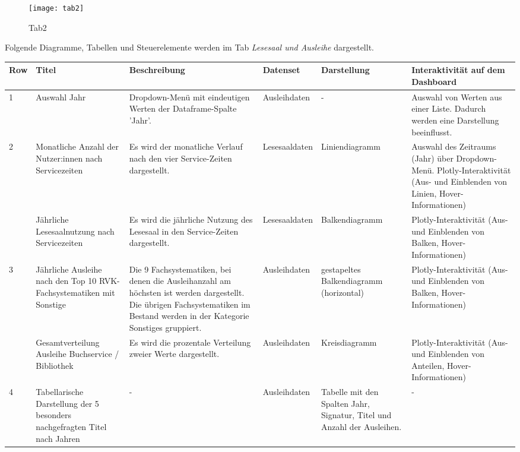     \begin{figure}[H]
        \centering
            \texttt{[image: tab2]}
            \caption{Tab2}
            \label{fig:tab2}
    \end{figure}
    
\clearpage
Folgende Diagramme, Tabellen und Steuerelemente werden im Tab \textit{Lesesaal und Ausleihe} dargestellt.


    \begingroup
    \setlength{\tabcolsep}{12pt} %
    \renewcommand{\arraystretch}{1.5} 
    \begin{table}[H]
        \centering
        \begin{adjustbox}{max width=\textwidth}
        \begin{tabular}{p{}p{}p{}p{}p{}p{}}
           \toprule
           Row        &Titel &Beschreibung &Datenset &Darstellung &Interaktivität auf dem Dashboard\\
           \midrule
            1           &Auswahl  Jahr &Dropdown-Menü mit eindeutigen Werten der Dataframe-Spalte 'Jahr'.&Ausleihdaten&- &Auswahl von Werten aus einer Liste. Dadurch werden eine Darstellung beeinflusst.\\
           \midrule
            2           &Monatliche Anzahl der Nutzer:innen nach Servicezeiten&Es wird der monatliche Verlauf nach den vier Service-Zeiten dargestellt.&Lesesaaldaten&Liniendiagramm&Auswahl des Zeitraums (Jahr) über Dropdown-Menü. Plotly-Interaktivität (Aus- und Einblenden von Linien, Hover-Informationen)\\
                        &Jährliche Lesesaalnutzung nach Servicezeiten&Es wird die jährliche Nutzung des Lesesaal in den Service-Zeiten dargestellt.&Lesesaaldaten&Balkendiagramm    &Plotly-Interaktivität (Aus- und Einblenden von Balken, Hover-Informationen)\\          
            \midrule
            3           &Jährliche Ausleihe nach den Top 10 RVK-Fachsystematiken mit Sonstige&Die 9 Fachsystematiken, bei denen die Ausleihanzahl am höchsten ist werden dargestellt. Die übrigen Fachsystematiken im Bestand werden in der Kategorie Sonstiges gruppiert.&Ausleihdaten&gestapeltes Balkendiagramm (horizontal)&Plotly-Interaktivität (Aus- und Einblenden von Balken, Hover-Informationen)\\
                        &Gesamtverteilung Ausleihe Buchservice / Bibliothek&Es wird die prozentale Verteilung zweier Werte dargestellt.&Ausleihdaten    &Kreisdiagramm   &Plotly-Interaktivität (Aus- und Einblenden von Anteilen, Hover-Informationen)\\
            \midrule
            4           &Tabellarische Darstellung der 5 besonders nachgefragten Titel nach Jahren&-&Ausleihdaten    &Tabelle mit den Spalten Jahr, Signatur, Titel und Anzahl der Ausleihen.&-\\


\end{tabular}
\end{adjustbox}
\end{table}
